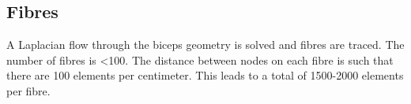 %
\clearpage
%
%
%

\begin{frame}
\section{Fibres}
%
A Laplacian flow through the biceps geometry is solved and fibres are traced. The number of fibres is <100.
The distance between nodes on each fibre is such that there are 100 elements per centimeter. This leads to a total of 1500-2000 elements per fibre.
\end{frame}


